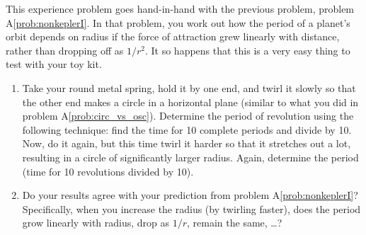 \begin{exercise}
  This experience problem goes hand-in-hand with the previous problem,
  problem A\ref{prob:nonkeplerI}.  In that problem, you work out how
  the period of a planet's orbit depends on radius if the force of
  attraction grew linearly with distance, rather than dropping off as
  $1/r^2$.  It so happens that this is a very easy thing to test with
  your toy kit.

  \begin{enumerate}
  \item Take your round metal spring, hold it by one end, and twirl it
    slowly so that the other end makes a circle in a horizontal plane
    (similar to what you did in problem A\ref{prob:circ_vs_osc}).
    Determine the period of revolution using the following technique:
    find the time for 10 complete periods and divide by 10.  Now, do
    it again, but this time twirl it harder so that it
    stretches out a lot, resulting in a circle of significantly larger
    radius.  Again, determine the period (time for 10 revolutions
    divided by 10).

  \item Do your results agree with your prediction from problem
    A\ref{prob:nonkeplerI}?  Specifically, when you increase the
    radius (by twirling faster), does the period grow linearly with
    radius, drop as $1/r$, remain the same, \dots ?

  \end{enumerate}
\end{exercise}


